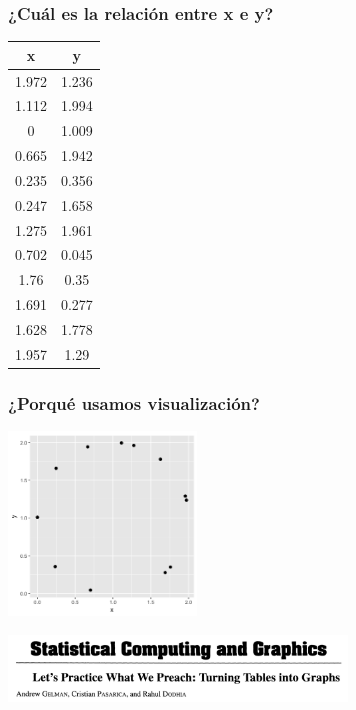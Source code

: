 \documentclass[9pt, spanish]{beamer}\usepackage[]{graphicx}\usepackage[]{color}
\begin{document}
\begin{frame}
\frametitle{¿Cu\'al es la relaci\'on entre x e y?}
\begin{center}
\begin{tabular}{ c | c  }
  \hline			
  x&	y\\ \hline
1.972&	1.236\\
1.112&	1.994\\
0	&1.009\\
0.665&	1.942\\
0.235&	0.356\\
0.247&	1.658\\
1.275&	1.961\\
0.702&	0.045\\
1.76&	0.35\\
1.691&	0.277\\
1.628&	1.778\\
1.957&	1.29\\
  \hline  
\end{tabular}
\end{center}
\end{frame}

\begin{frame}
\frametitle{¿Porqu\'e usamos visualizaci\'on?}
\begin{center}
\includegraphics[width=5cm]{Circulo}
\end{center}
\begin{center}
\includegraphics[width=9cm]{gelman}
\end{center}
\end{frame}
\end{document}
